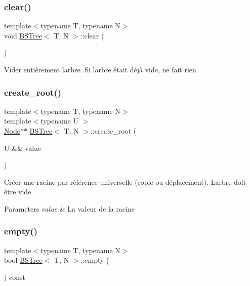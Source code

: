 \subsubsection{\texorpdfstring{clear()}{clear()}}
{\footnotesize\ttfamily template$<$typename T, typename N$>$ \\
void \hyperlink{classBSTree}{B\+S\+Tree}$<$ T, N $>$\+::clear (\begin{DoxyParamCaption}{ }\end{DoxyParamCaption})\hspace{0.3cm}{\ttfamily [inline]}}

Vider entièrement l\textquotesingle{}arbre. Si l\textquotesingle{}arbre était déjà vide, ne fait rien. \mbox{\label{classBSTree_ab708b6687e1e241e3b101b5a7d1cff01}} 
\subsubsection{\texorpdfstring{create\+\_\+root()}{create\_root()}}
{\footnotesize\ttfamily template$<$typename T, typename N$>$ \\
template$<$typename U $>$ \\
\hyperlink{classBSTree_a9c1a06548b3ff425e1d906f17ce2c858}{Node}$\ast$$\ast$ \hyperlink{classBSTree}{B\+S\+Tree}$<$ T, N $>$\+::create\+\_\+root (\begin{DoxyParamCaption}\item[{U \&\&}]{value }\end{DoxyParamCaption})\hspace{0.3cm}{\ttfamily [inline]}}

Créer une racine par référence universelle (copie ou déplacement). L\textquotesingle{}arbre doit être vide. 
\begin{DoxyParams}{Parameters}
{\em value} & La valeur de la racine \\
\hline
\end{DoxyParams}
\mbox{\label{classBSTree_a4962f6576d06c47a12a94045b5c1efa8}} 
\subsubsection{\texorpdfstring{empty()}{empty()}}
{\footnotesize\ttfamily template$<$typename T, typename N$>$ \\
bool \hyperlink{classBSTree}{B\+S\+Tree}$<$ T, N $>$\+::empty (\begin{DoxyParamCaption}{ }\end{DoxyParamCaption}) const\hspace{0.3cm}{\ttfamily [inline]}}

